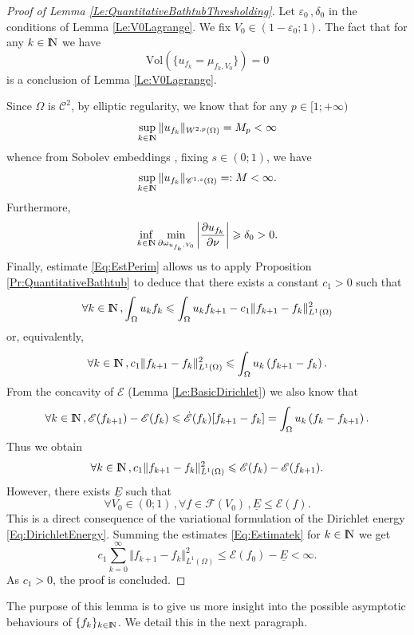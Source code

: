 \documentclass{article}
\newcommand{\N}{\textnormal{I\kern-0.21emN}}
\renewcommand{\geq}{\geqslant}
\renewcommand{\leq}{\leqslant}
\def\e{{\varepsilon}}
\def\O{{\Omega}}
\numberwithin{equation}{section}
\begin{document}
\begin{proof}[Proof of Lemma \ref{Le:QuantitativeBathtubThresholding}]
Let $\e_0\,, \delta_0$ in the conditions of Lemma \ref{Le:V0Lagrange}. We fix $V_0\in (1-\e_0;1)$. The fact that for any $k\in \N$ we have 
\[ \mathrm{Vol}\left(\{u_{f_k}=\mu_{f_k,V_0}\}\right)=0\] is a conclusion of Lemma \ref{Le:V0Lagrange}. 

Since $\O$ is $\mathscr C^2$, by elliptic regularity, we know that for any $p\in [1;+\infty)$
\[ \sup_{k\in \N}\Vert u_{f_k}\Vert_{W^{2,p}(\O)}=M_p<\infty\]whence from Sobolev embeddings \cite[Theorem 12.5]{Leoni}, fixing $s\in (0;1)$, we have 
\[ \sup_{k\in \N}\Vert u_{f_k}\Vert_{\mathscr C^{1,s}(\O)}=:M<\infty.\] Furthermore, 
\[ \inf_{k\in \N}\min_{\partial \omega_{u_{f_k},V_0}}\left|\frac{\partial u_{f_k}}{\partial \nu}\right|\geq \delta_0>0.\]Finally, estimate \eqref{Eq:EstPerim} allows us to apply Proposition \ref{Pr:QuantitativeBathtub} to deduce that there exists a constant $c_1>0$ such that
\[ \forall k\in \N\,, \int_\O u_kf_k\leq \int_\O u_k f_{k+1}-c_1\Vert f_{k+1}-f_k\Vert_{L^1(\O)}^2\] or, equivalently, 
\begin{equation}\label{Eq:Credo}\forall k\in \N\,, c_1\Vert f_{k+1}-f_k\Vert_{L^1(\O)}^2\leq \int_\O u_k \left(f_{k+1}-f_k\right).\end{equation} From the concavity of $\mathscr E$ (Lemma \ref{Le:BasicDirichlet})  we also know that
\[ \forall k\in \N\,, \mathscr E(f_{k+1})-\mathscr E(f_k)\leq \dot{\mathscr E}(f_k)[f_{k+1}-f_k]=\int_\O u_k\left(f_k-f_{k+1}\right).\] Thus we obtain
\begin{equation}\label{Eq:Estimatek}\forall k\in \N\,, c_1\Vert f_{k+1}-f_k\Vert_{L^1(\O)}^2\leq \mathscr E(f_k)-\mathscr E(f_{k+1}).\end{equation}
However, there exists $\underline E$ such that 
\begin{equation}\label{Eq:LowerDirichlet}
\forall V_0\in (0;1)\,, \forall f \in \mathcal F(V_0)\,, \underline E\leq \mathscr E(f).\end{equation}
This is a direct consequence of the variational formulation of the Dirichlet energy \eqref{Eq:DirichletEnergy}. Summing the estimates \eqref{Eq:Estimatek} for $k\in \N$ we get 
\[ c_1\sum_{k=0}^\infty \Vert f_{k+1}-f_k\Vert_{L^1(\O)}^2\leq \mathscr E(f_0)-\underline E<\infty.\] As $c_1>0$, the proof is concluded.
\end{proof}

The purpose of this lemma is to give us more insight into the possible asymptotic behaviours of $\{f_k\}_{k\in \N}$. We detail this in the next paragraph.
\end{document}
